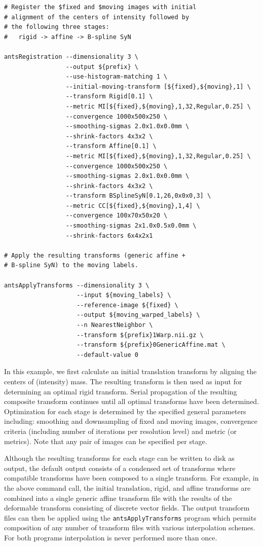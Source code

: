 \documentclass{frontiersSCNS}
\begin{document}
\begin{lstlisting}
# Register the $fixed and $moving images with initial
# alignment of the centers of intensity followed by 
# the following three stages:
#   rigid -> affine -> B-spline SyN

antsRegistration --dimensionality 3 \
                 --output ${prefix} \
                 --use-histogram-matching 1 \
                 --initial-moving-transform [${fixed},${moving},1] \
                 --transform Rigid[0.1] \
                 --metric MI[${fixed},${moving},1,32,Regular,0.25] \ 
                 --convergence 1000x500x250 \
                 --smoothing-sigmas 2.0x1.0x0.0mm \
                 --shrink-factors 4x3x2 \
                 --transform Affine[0.1] \
                 --metric MI[${fixed},${moving},1,32,Regular,0.25] \ 
                 --convergence 1000x500x250 \
                 --smoothing-sigmas 2.0x1.0x0.0mm \
                 --shrink-factors 4x3x2 \
                 --transform BSplineSyN[0.1,26,0x0x0,3] \
                 --metric CC[${fixed},${moving},1,4] \ 
                 --convergence 100x70x50x20 \
                 --smoothing-sigmas 2x1.0x0.5x0.0mm \
                 --shrink-factors 6x4x2x1

# Apply the resulting transforms (generic affine + 
# B-spline SyN) to the moving labels.
                   
antsApplyTransforms --dimensionality 3 \
                    --input ${moving_labels} \
                    --reference-image ${fixed} \
                    --output ${moving_warped_labels} \
                    --n NearestNeighbor \
                    --transform ${prefix}1Warp.nii.gz \
                    --transform ${prefix}0GenericAffine.mat \
                    --default-value 0
\end{lstlisting}
In this example, we first calculate an initial translation transform by aligning
the centers of (intensity) mass. The resulting transform is then used as input 
for determining an optimal rigid transform.  Serial propagation of the resulting
composite transform continues until all optimal transforms have been determined.
Optimization for each stage is determined by the specified general parameters 
including: smoothing and downsampling of fixed and moving images, convergence
criteria (including number of iterations per resolution level) and metric (or
metrics).  Note that any pair of images can be specified per stage.  

Although the
resulting transforms for each stage can be written to disk as output, the 
default output consists of a condensed set of transforms where compatible 
transforms have been composed to a single transform.  For example, in the
above command call, the initial translation, rigid, and affine transforms are
combined into a single generic affine transform file with the results of the
deformable transform consisting of discrete vector fields.  The output
transform files can then be applied using the {\tt antsApplyTransforms}
program which permits composition of any number of transform files with 
various interpolation schemes.   For both programs interpolation is never
performed more than once. 
\end{document}
